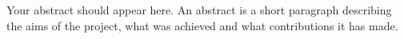Your abstract should appear here.  An abstract is a short
paragraph describing the aims of the project, what was
achieved and what contributions it has made.